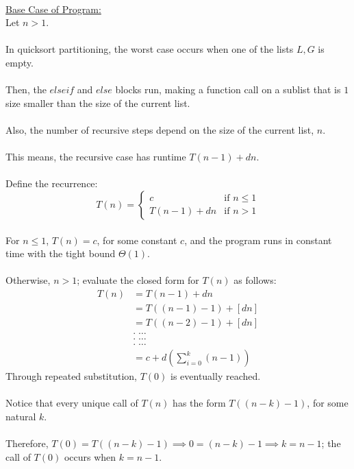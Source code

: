 \documentclass[12pt]{article}
\begin{document}
\\
\underline{Base Case of Program:} \\
Let $n > 1$. \\
\\
In quicksort partitioning, the worst case occurs when one of the lists $L, G$ is empty. \\
\\
Then, the $else if$ and $else$ blocks run, making a function call on a sublist that is $1$ size smaller than the size of the current list. \\
\\
Also, the number of recursive steps depend on the size of the current list, $n$. \\
\\
This means, the recursive case has runtime $T(n - 1) + dn$. \\
\\
Define the recurrence:
\[
    T(n) =
    \begin{cases}
        c & \text{if } n \leq 1 \\
        T(n - 1) + dn & \text{if } n > 1
    \end{cases}
\]
\\
For $n \leq 1$, $T(n) = c$, for some constant $c$, and the program runs in constant time with the tight bound $\Theta (1)$. \\
\\
Otherwise, $n > 1$; evaluate the closed form for $T(n)$ as follows:
\begin{equation*}
    \begin{aligned}
        T(n) &= T(n - 1) + dn \\
        &= T((n - 1) - 1) + [dn] \\
        &= T((n - 2) - 1) + [dn] \\
        &. \; \dots \\
        &. \; \dots \\
        &. \; \dots \\
        &= c + d(\sum_{i = 0}^{k} (n - 1))
    \end{aligned}
\end{equation*}
Through repeated substitution, $T(0)$ is eventually reached. \\
\\
Notice that every unique call of $T(n)$ has the form $T((n - k) - 1)$, for some natural $k$. \\
\\
Therefore, $T(0) = T((n - k) - 1) \implies 0 = (n - k) - 1 \implies k = n - 1$; the call of $T(0)$ occurs when $k = n - 1$. \\
\end{document}
